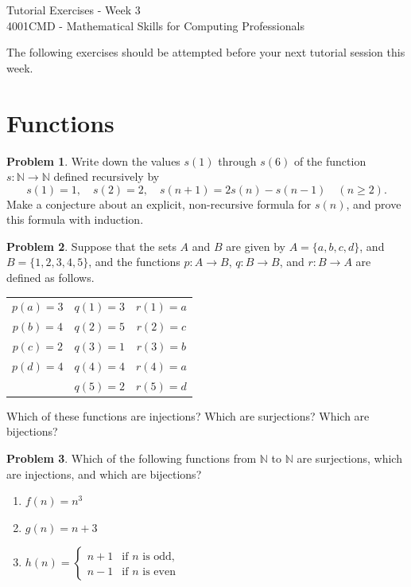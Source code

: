 \documentclass{article}
\numberwithin{equation}{section}
\theoremstyle{plain}
\theoremstyle{definition}
\newtheorem{problem}{Problem}
\newcommand{\N}{\mathbb N}
\begin{document}
\begin{center}
\Large{Tutorial Exercises - Week 3} \\
\vspace{3mm}
\large{4001CMD - Mathematical Skills for Computing Professionals} \\
\vspace{5mm}
\end{center}


The following exercises should be attempted before your next tutorial session this week. 


\section*{Functions}

\begin{problem}
	Write down the values $s(1)$ through $s(6)$ of the function $s : \N \to \N$ defined recursively by 
	\[
	s(1) = 1, \quad s(2) = 2, \quad s(n+1) = 2s(n) - s(n-1) \quad (n \geq 2).
	\]
	Make a conjecture about an explicit, non-recursive formula for $s(n)$, and prove this formula with induction. 
\end{problem}

\begin{problem}
	Suppose that the sets $A$ and $B$ are given by $A = \{a,b,c,d\}$, and $B = \{1,2,3,4,5\}$, and the functions $p : A \to B$, $q : B \to B$, and $r : B \to A$ are defined as follows. 
	\begin{center}
		\begin{tabular}{ccc}
			$p(a) = 3$ & $q(1) = 3$ & $ r(1) = a$ \\
			$p(b) = 4$ & $q(2) = 5$ & $r(2) = c$ \\
			$p(c) = 2$ & $q(3) = 1$ & $r(3) = b$ \\
			$p(d) = 4$ & $q(4) = 4$ & $r(4) = a$ \\
			& $q(5) = 2$ & $r(5) = d$
		\end{tabular}
	\end{center}
	Which of these functions are injections? Which are surjections? Which are bijections? 
\end{problem}

\begin{problem}
	Which of the following functions from $\N$ to $\N$ are surjections, which are injections, and which are bijections?
	\begin{enumerate}[label=(\alph*)]
		\item $f(n) = n^3$ \\
		\item $g(n) = n+3$ \\
		\item $h(n) = \displaystyle \begin{cases} n+1 & \textrm{if $n$ is odd,} \\ n-1 & \textrm{if $n$ is even}\end{cases}$
	\end{enumerate}
\end{problem}
\end{document}
